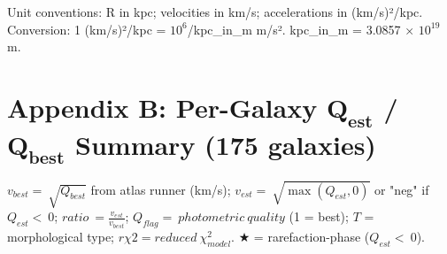 Unit conventions: R in kpc; velocities in km/s; accelerations in (km/s)²/kpc. Conversion: 1 (km/s)²/kpc = \ensuremath{10^{6}}/kpc\_in\_m m/s². kpc\_in\_m = 3.0857 × \ensuremath{10^{19}} m.

\section{}\label{section-11}

\section{\texorpdfstring{Appendix B: Per-Galaxy \(\mathbf{Q}_{\mathbf{est}}\) / \(\mathbf{Q}_{\mathbf{best}}\) Summary (175 galaxies)}{Appendix B: Per-Galaxy \textbackslash mathbf\{Q\}\_\{\textbackslash mathbf\{est\}\} / \textbackslash mathbf\{Q\}\_\{\textbackslash mathbf\{best\}\} Summary (175 galaxies)}}\label{appendix-b-per-galaxy-mathbfq_mathbfest-mathbfq_mathbfbest-summary-175-galaxies}

\(v_{best} = \ \sqrt{Q_{best}}\) from atlas runner (km/s); \(v_{est} = \ \sqrt{\max\left( Q_{est},0 \right)}\) or "neg" if \(Q_{est} < \ 0\); \(ratio\  = \frac{v_{est}}{v_{best}}\); \(Q_{flag} = \ photometric\ quality\) (1 = best); \(T\) = morphological type; \(r\chi 2 = reduced{\ \chi}_{model}^{2}\). ★ = rarefaction-phase (\(Q_{est} < \ 0\)).

